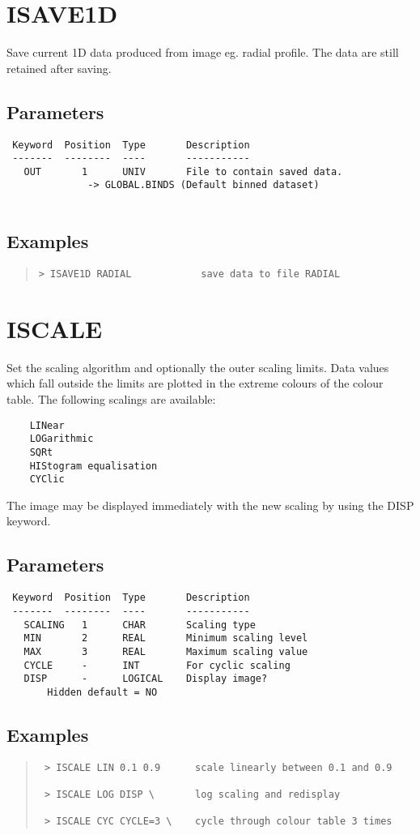 \documentclass{book}
\renewcommand{\_}{{\tt\char'137}}     %
\begin{document}
\section{ISAVE1D}
Save current 1D data produced from image eg. radial profile.
The data are still retained after saving.
 
\subsection{Parameters}
\begin{verbatim}
 Keyword  Position  Type       Description
 -------  --------  ----       -----------
   OUT       1      UNIV       File to contain saved data.
              -> GLOBAL.BINDS (Default binned dataset)
 
\end{verbatim}\subsection{Examples}
\begin{quote}\begin{verbatim}
> ISAVE1D RADIAL            save data to file RADIAL
\end{verbatim}\end{quote}
\section{ISCALE}
Set the scaling algorithm and optionally the outer scaling limits.
Data values which fall outside the limits are plotted in the extreme
colours of the colour table. The following scalings are available:
 
\begin{verbatim}
    LINear
    LOGarithmic
    SQRt
    HIStogram equalisation
    CYClic
 \end{verbatim}
The image may be displayed immediately with the new scaling by using
the DISP keyword.
 
\subsection{Parameters}
\begin{verbatim}
 Keyword  Position  Type       Description
 -------  --------  ----       -----------
   SCALING   1      CHAR       Scaling type
   MIN       2      REAL       Minimum scaling level
   MAX       3      REAL       Maximum scaling value
   CYCLE     -      INT        For cyclic scaling
   DISP      -      LOGICAL    Display image?
       Hidden default = NO
\end{verbatim}\subsection{Examples}
\begin{quote}\begin{verbatim}
 > ISCALE LIN 0.1 0.9      scale linearly between 0.1 and 0.9
 
 > ISCALE LOG DISP \       log scaling and redisplay
 
 > ISCALE CYC CYCLE=3 \    cycle through colour table 3 times
 \end{verbatim}\end{quote}
\end{document}
